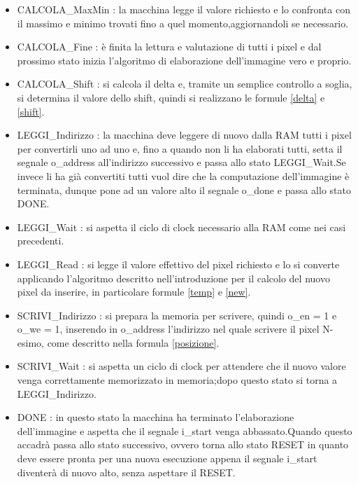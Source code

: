 \begin{itemize}
    \item CALCOLA\_MaxMin : la macchina legge il valore richiesto e lo confronta con il massimo e minimo trovati fino a quel momento,aggiornandoli se necessario.
    
    \item CALCOLA\_Fine : è finita la lettura e valutazione di tutti i pixel e dal prossimo stato inizia l'algoritmo di elaborazione dell'immagine vero e proprio.
    
    \item CALCOLA\_Shift : si calcola il delta e, tramite un semplice controllo a soglia, si determina il valore dello shift, quindi si realizzano le formule \eqref{delta} e \eqref{shift}.
    
    \item LEGGI\_Indirizzo : la macchina deve leggere di nuovo dalla RAM tutti i pixel per convertirli uno ad uno e, fino a quando non li ha elaborati tutti, setta il segnale o\_address all'indirizzo successivo e passa allo stato LEGGI\_Wait.Se invece li ha già convertiti tutti vuol dire che la computazione dell'immagine è terminata, dunque pone ad un valore alto il segnale o\_done e passa allo stato DONE.
    
    \item LEGGI\_Wait : si aspetta il ciclo di clock necessario alla RAM come nei casi precedenti.
    
    \item LEGGI\_Read : si legge il valore effettivo del pixel richiesto e lo si converte applicando l'algoritmo descritto nell'introduzione per il calcolo del nuovo pixel da inserire, in particolare formule \eqref{temp} e \eqref{new}.
    
    \item SCRIVI\_Indirizzo : si prepara la memoria per scrivere, quindi o\_en = 1 e o\_we = 1, inserendo in o\_address l'indirizzo nel quale scrivere il pixel N-esimo, come descritto nella formula \eqref{posizione}.
    
    \item SCRIVI\_Wait : si aspetta un ciclo di clock per attendere che il nuovo valore venga correttamente memorizzato in memoria;dopo questo stato si torna a LEGGI\_Indirizzo.
    
    \item DONE : in questo stato la macchina ha terminato l'elaborazione dell'immagine e aspetta che il segnale i\_start venga abbassato.Quando questo accadrà passa allo stato successivo, ovvero torna allo stato RESET in quanto deve essere pronta per una nuova esecuzione appena il segnale i\_start diventerà di nuovo alto, senza aspettare il RESET.
\end{itemize}

